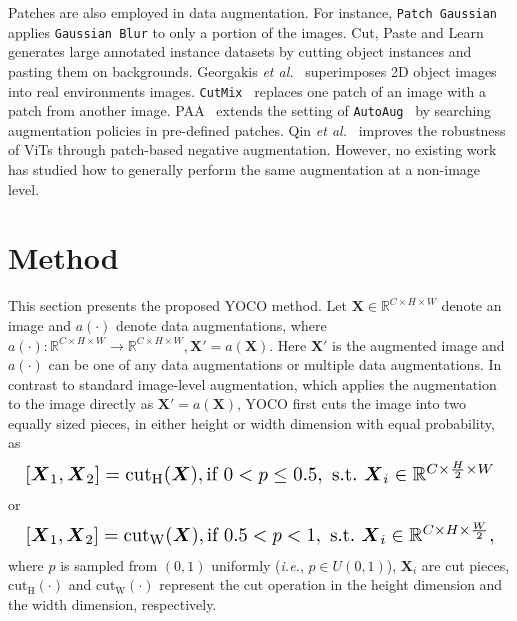 \documentclass{article}
\newcommand\eg{\emph{e.g.,}} \newcommand\Eg{\emph{E.g.}}
\newcommand\ie{\emph{i.e.}} \newcommand\Ie{\emph{I.e.}}
\newcommand\etc{\emph{etc.}}
\newcommand\etal{\emph{et al.}}
\def\Vec#1{{\boldsymbol{#1}}}
\begin{document}
Patches are also employed in data augmentation. For instance, \texttt{Patch Gaussian}~\cite{lopes2019improving} applies \texttt{Gaussian Blur} to only a portion of the images. 
Cut, Paste and Learn~\cite{dwibedi2017cut} generates large annotated instance datasets by cutting object instances and pasting them on backgrounds. Georgakis \etal{}~\cite{georgakis2017synthesizing} superimposes 2D object images into real environments images.
\texttt{CutMix}~\cite{yun2019CutMix} replaces one patch of an image with a patch from another image.
PAA~\cite{lin2021local} extends the setting of \texttt{AutoAug}~\cite{cubuk2018autoaugment} by searching augmentation policies in pre-defined patches. Qin \etal{}~\cite{qin2021understanding} improves the robustness of ViTs through patch-based negative augmentation. However, no existing work has studied how to generally perform the same augmentation at a non-image level. 



\section{Method}
This section presents the proposed YOCO method.
Let $\Vec{X} \in \mathbb{R}^{C\times H \times W}$ denote an image and $a(\cdot)$ denote data augmentations, where $a(\cdot): \mathbb{R}^{C\times H \times W} \to \mathbb{R}^{C\times H \times W}, \Vec{X}' = a(\Vec{X})$. Here $\Vec{X}'$ is the augmented image and $a(\cdot)$ can be one of any data augmentations or multiple data augmentations.
In contrast to standard image-level augmentation, which applies the augmentation to the image directly {as $\Vec{X}' = a(\Vec{X})$}, YOCO first cuts the image into two equally sized pieces, in either height or width dimension with equal probability, as
\begin{equation*}
\resizebox{1.00\hsize}{!}{
$[\Vec{X}_1, \Vec{X}_2] = \mathrm{cut}_{\mathrm{H}}(\Vec{X}),\mbox{if $0 <p \leq 0.5$}, ~\text{s.t.}~\Vec{X}_i \in \mathbb{R}^{C \times \frac{H}{2} \times W}$
}
\end{equation*}
or
\begin{equation*}
\resizebox{1.00\hsize}{!}{
$[\Vec{X}_1, \Vec{X}_2] = \mathrm{cut}_{\mathrm{W}}(\Vec{X}),\mbox{if $0.5 <p < 1$}, ~\text{s.t.}~\Vec{X}_i \in \mathbb{R}^{C \times H \times \frac{W}{2}},$
}
\end{equation*}
where $p$ is sampled from $(0,1)$ uniformly (\ie, $p \in U(0, 1)$), $\Vec{X}_i$ are cut pieces, $\mathrm{cut}_{\mathrm{H}}(\cdot)$ and $\mathrm{cut}_{\mathrm{W}}(\cdot)$ represent the cut operation in the height dimension and the width dimension, respectively.
\end{document}

